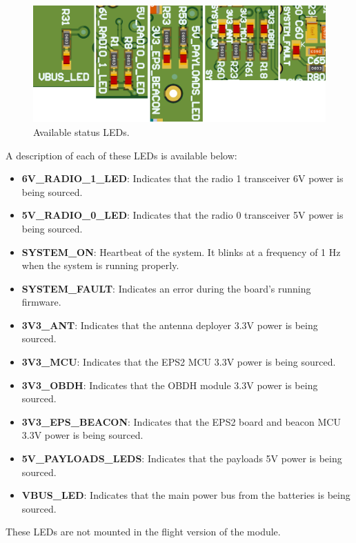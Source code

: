 \begin{figure}[!ht]
    \begin{center}
        \includegraphics[width=\textwidth]{figures/status_leds.png}
        \caption{Available status LEDs.}
        \label{fig:status-leds}
    \end{center}
\end{figure}

A description of each of these LEDs is available below:

\begin{itemize}
    \item \textbf{6V\_RADIO\_1\_LED}: Indicates that the radio 1 transceiver 6V power is being sourced.
    \item \textbf{5V\_RADIO\_0\_LED}: Indicates that the radio 0 transceiver 5V power is being sourced.
    \item \textbf{SYSTEM\_ON}: Heartbeat of the system. It blinks at a frequency of 1 Hz when the system is running properly.
    \item \textbf{SYSTEM\_FAULT}: Indicates an error during the board's running firmware.
    \item \textbf{3V3\_ANT}: Indicates that the antenna deployer 3.3V power is being sourced.
    \item \textbf{3V3\_MCU}: Indicates that the EPS2 MCU 3.3V power is being sourced.
    \item \textbf{3V3\_OBDH}: Indicates that the OBDH module 3.3V power is being sourced.
    \item \textbf{3V3\_EPS\_BEACON}: Indicates that the EPS2 board and beacon MCU 3.3V power is being sourced.
    \item \textbf{5V\_PAYLOADS\_LEDS}: Indicates that the payloads 5V power is being sourced.
    \item \textbf{VBUS\_LED}: Indicates that the main power bus from the batteries is being sourced.
\end{itemize}

These LEDs are not mounted in the flight version of the module.

